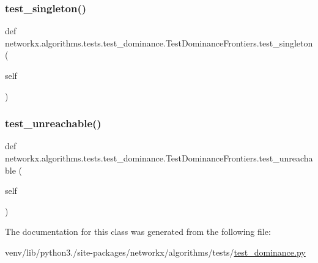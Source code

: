 \subsubsection{\texorpdfstring{test\+\_\+singleton()}{test\_singleton()}}
{\footnotesize\ttfamily def networkx.\+algorithms.\+tests.\+test\+\_\+dominance.\+Test\+Dominance\+Frontiers.\+test\+\_\+singleton (\begin{DoxyParamCaption}\item[{}]{self }\end{DoxyParamCaption})}

\mbox{\label{classnetworkx_1_1algorithms_1_1tests_1_1test__dominance_1_1TestDominanceFrontiers_a7b34833b3391fb66e83bd4f14c3c62ca}} 
\subsubsection{\texorpdfstring{test\+\_\+unreachable()}{test\_unreachable()}}
{\footnotesize\ttfamily def networkx.\+algorithms.\+tests.\+test\+\_\+dominance.\+Test\+Dominance\+Frontiers.\+test\+\_\+unreachable (\begin{DoxyParamCaption}\item[{}]{self }\end{DoxyParamCaption})}



The documentation for this class was generated from the following file\+:\begin{DoxyCompactItemize}
\item 
venv/lib/python3./site-\/packages/networkx/algorithms/tests/\hyperlink{test__dominance_8py}{test\+\_\+dominance.\+py}\end{DoxyCompactItemize}
